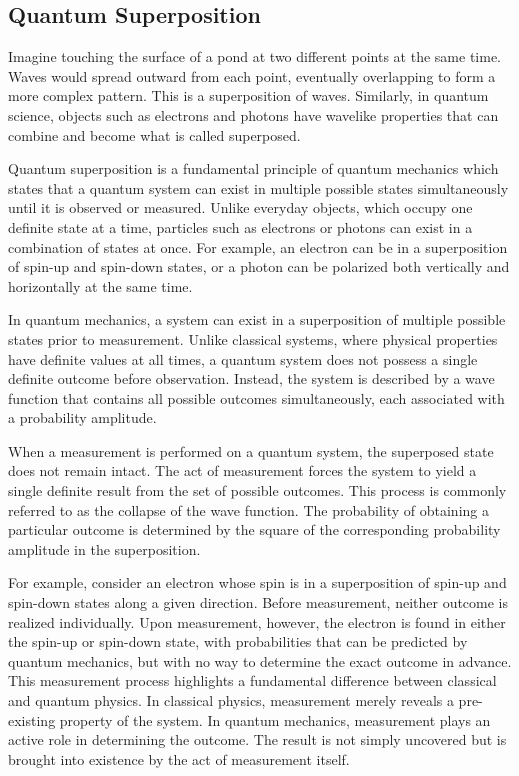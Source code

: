 \documentclass[14pt,a4paper]{extarticle}
\begin{document}
\subsection{Quantum Superposition}
Imagine touching the surface of a pond at two different points at the same time. Waves would spread outward from each point, eventually overlapping to form a more complex pattern. This is a superposition of waves. Similarly, in quantum science, objects such as electrons and photons have wavelike properties that can combine and become what is called superposed.

Quantum superposition is a fundamental principle of quantum mechanics which states that a quantum system can exist in multiple possible states simultaneously until it is observed or measured. Unlike everyday objects, which occupy one definite state at a time, particles such as electrons or photons can exist in a combination of states at once. For example, an electron can be in a superposition of spin-up and spin-down states, or a photon can be polarized both vertically and horizontally at the same time.

In quantum mechanics, a system can exist in a superposition of multiple possible states prior to measurement. Unlike classical systems, where physical properties have definite values at all times, a quantum system does not possess a single definite outcome before observation. Instead, the system is described by a wave function that contains all possible outcomes simultaneously, each associated with a probability amplitude.

When a measurement is performed on a quantum system, the superposed state does not remain intact. The act of measurement forces the system to yield a single definite result from the set of possible outcomes. This process is commonly referred to as the collapse of the wave function. The probability of obtaining a particular outcome is determined by the square of the corresponding probability amplitude in the superposition.

For example, consider an electron whose spin is in a superposition of spin-up and spin-down states along a given direction. Before measurement, neither outcome is realized individually. Upon measurement, however, the electron is found in either the spin-up or spin-down state, with probabilities that can be predicted by quantum mechanics, but with no way to determine the exact outcome in advance.
This measurement process highlights a fundamental difference between classical and quantum physics. In classical physics, measurement merely reveals a pre-existing property of the system. In quantum mechanics, measurement plays an active role in determining the outcome. The result is not simply uncovered but is brought into existence by the act of measurement itself.
\end{document}
